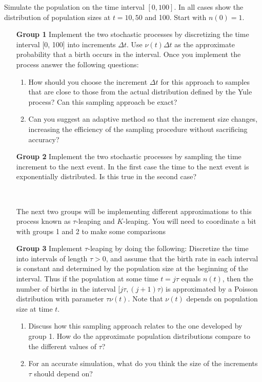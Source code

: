 \documentclass[12pt]{article}
\begin{document}
Simulate the population on the time interval $[0, 100]$. In all cases show the distribution of population sizes at $t = 10, 50$ and 100. Start with $n(0) = 1$.

\begin{enumerate}
\item[\bf Group 1] 
Implement the two stochastic processes by discretizing the time interval [0, 100] into increments $\Delta t$. Use $\nu(t)\Delta t$ as the approximate probability that a birth occurs in the interval. Once you implement the process answer the following questions:
\begin{enumerate}
	\item How should you choose the increment $\Delta t$ for this approach to samples that are close to those from the actual distribution defined by the Yule process? Can this sampling approach be exact?
	\item Can you suggest an adaptive method so that the increment size changes, increasing the efficiency of the sampling procedure without sacrificing accuracy?

\end{enumerate}

\item[\bf Group 2] 
	Implement the two stochastic processes by sampling the time increment to the next event. In the first case the time to the next event is exponentially distributed. Is this true in the second case?
	
	\
	\
	
	The next two groups will be implementing different approximations to this process known as $\tau$-leaping and $K$-leaping. You will need to coordinate a bit with groups 1 and 2 to make some comparisons
	
\item[\bf Group 3] 
	Implement $\tau$-leaping by doing the following: Discretize the time into intervals of length $\tau > 0$, and assume that the birth rate in each interval is constant and determined by the population size at the beginning of the interval. Thus if the population at some time $t = j\tau$ equals $n(t)$, then the number of births in the interval $[j\tau,(j + 1)\tau)$ is approximated by a Poisson distribution with parameter $\tau\nu(t)$. Note that $\nu(t)$ depends on population size at time $t$.

\begin{enumerate}
	\item Discuss how this sampling approach relates to the one developed by group 1. How do the approximate population distributions compare to the different values of $\tau$?
	\item For an accurate simulation, what do you think the size of the increments $\tau$ should depend on?
\end{enumerate}
	

\end{enumerate}
\end{document}
